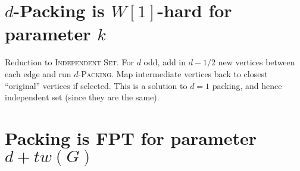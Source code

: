 \documentclass[10pt, a4paper]{article}
\theoremstyle{definition}
\begin{document}
\section{$d$-\sc Packing \textnormal{is $W[1]$-hard for parameter $k$}}

Reduction to \textsc{Independent Set}. For $d$ odd, add in $d-1/2$ new vertices between each edge and run $d$-\textsc{Packing}. Map intermediate vertices back to closest ``original'' vertices if selected. This is a solution to $d=1$ packing, and hence independent set (since they are the same).

\section{\sc Packing \textnormal{is FPT for parameter $d + tw(G)$}}



\end{document}
